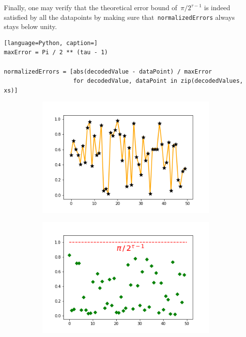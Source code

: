 \documentclass{article}
\begin{document}
\vspace{0.1cm}

\noindent Finally, one may verify that the theoretical error bound of~$\pi / 2^{\tau -1}$ is indeed satisfied by all the datapoints by making sure that~\texttt{normalizedErrors} always stays below unity.

\vspace{0.1cm}

\begin{lstlisting}[language=Python, caption=]
maxError = Pi / 2 ** (tau - 1)

normalizedErrors = [abs(decodedValue - dataPoint) / maxError 
                    for decodedValue, dataPoint in zip(decodedValues, xs)]
\end{lstlisting}

\begin{figure}[hb!]
\centering
\begin{subfigure}{.48\textwidth}
  \centering
  \includegraphics[width=\linewidth]{resources/codeExamples/decodedValues_logistic.png}
\end{subfigure}%
\begin{subfigure}{.48\textwidth}
  \centering
  \includegraphics[width=\linewidth]{resources/codeExamples/normalizedError_logistic.png}

\end{subfigure}
\end{figure}
\end{document}
